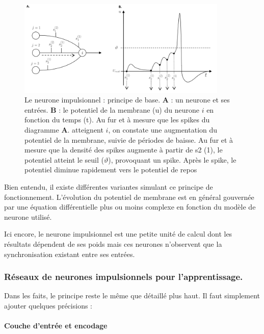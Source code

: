 \begin{figure}[!h]
\label{fig:neuronSpike}
\centering
\includegraphics[width=10cm]{./images/image9.png}
\caption{Le neurone impulsionnel : principe de base. \textbf{A} : un neurone et ses entrées. \textbf{B} : le potentiel de la membrane (u) du neurone $i$ en fonction du temps (t). Au fur et à mesure que les spikes du diagramme \textbf{A}. atteignent $i$, on constate une augmentation du potentiel de la membrane, suivie de périodes de baisse. Au fur et à mesure que la densité des spikes augmente à partir de s2 (1), le potentiel atteint le seuil ($\vartheta$), provoquant un spike. Après le spike, le potentiel diminue rapidement vers le potentiel de repos}
\end{figure}

Bien entendu, il existe différentes variantes simulant ce principe de
fonctionnement. L'évolution du potentiel de membrane est en général
gouvernée par une équation différentielle plus ou moins complexe en
fonction du modèle de neurone utilisé.

Ici encore, le neurone impulsionnel est une petite unité de calcul dont
les résultats dépendent de ses poids mais ces neurones n'observent que
la synchronisation existant entre ses entrées.

\hypertarget{ruxe9seaux-de-neurones-impulsionnels-pour-lapprentissage.}{%
\subsubsection{Réseaux de neurones impulsionnels pour
l'apprentissage.}\label{ruxe9seaux-de-neurones-impulsionnels-pour-lapprentissage.}}

Dans les faits, le principe reste le même que détaillé plus haut. Il
faut simplement ajouter quelques précisions :

\hypertarget{couche-dentruxe9e-et-encodage}{%
\paragraph{Couche d'entrée et
encodage}\label{couche-dentruxe9e-et-encodage}}

